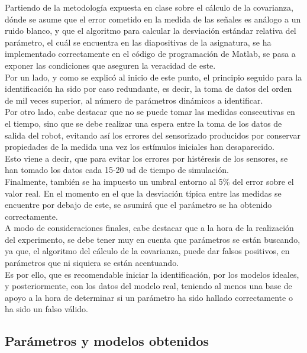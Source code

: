 Partiendo de la metodología expuesta en clase sobre el cálculo de la covarianza, dónde se asume que el error cometido en la medida de las señales es análogo a un ruido blanco, y que el algoritmo para calcular la desviación estándar relativa del parámetro, el cuál se encuentra en las diapositivas de la asignatura, se ha implementado correctamente en el código de programación de Matlab, se pasa a exponer las condiciones que aseguren la veracidad de este. \\

Por un lado, y como se explicó al inicio de este punto, el principio seguido para la identificación ha sido por caso redundante, es decir, la toma de datos del orden de mil veces superior, al número de parámetros dinámicos a identificar.\\
Por otro lado, cabe destacar que no se puede tomar las medidas consecutivas en el tiempo, sino que se debe realizar una espera entre la toma de los datos de salida del robot, evitando así los errores del sensorizado producidos por conservar propiedades de la medida una vez los estímulos iniciales han desaparecido.\\
Esto viene a decir, que para evitar los errores por histéresis de los sensores, se han tomado los datos cada 15-20 ud de tiempo de simulación.\\

Finalmente, también se ha impuesto un umbral entorno al 5\% del error sobre el valor real. En el momento en el que la desviación típica entre las medidas se encuentre por debajo de este, se asumirá que el parámetro se ha obtenido correctamente.\\

\newpage
A modo de consideraciones finales, cabe destacar que a la hora de la realización del experimento, se debe tener muy en cuenta que parámetros se están buscando, ya que,	el algoritmo del cálculo de la covarianza, puede dar falsos positivos, en parámetros que ni siquiera se están acentuando.\\

Es por ello, que es recomendable iniciar la identificación, por los modelos ideales, y posteriormente, con los datos del modelo real, teniendo al menos una base de apoyo a la hora de determinar si un parámetro ha sido hallado correctamente o ha sido un falso válido.



\subsection{Parámetros y modelos obtenidos}

